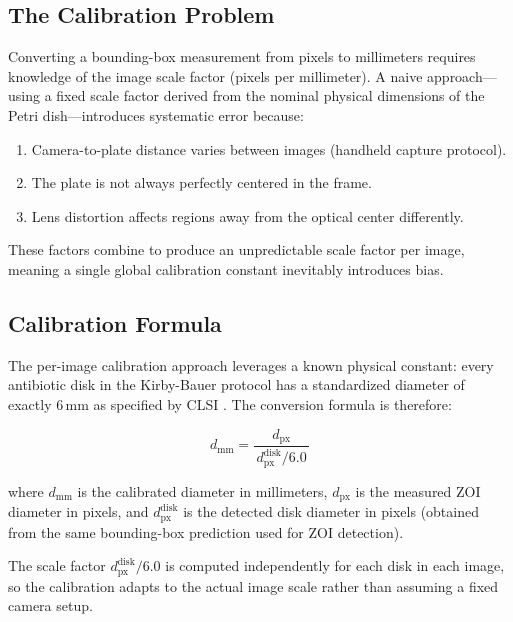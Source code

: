 \subsection{The Calibration Problem}

Converting a bounding-box measurement from pixels to millimeters requires
knowledge of the image scale factor (pixels per millimeter).
A naive approach---using a fixed scale factor derived from the nominal physical dimensions
of the Petri dish---introduces systematic error because:

\begin{enumerate}
  \item Camera-to-plate distance varies between images (handheld capture protocol).
  \item The plate is not always perfectly centered in the frame.
  \item Lens distortion affects regions away from the optical center differently.
\end{enumerate}

These factors combine to produce an unpredictable scale factor per image,
meaning a single global calibration constant inevitably introduces bias.

\subsection{Calibration Formula}

The per-image calibration approach leverages a known physical constant:
every antibiotic disk in the Kirby-Bauer protocol has a standardized diameter of exactly 6\,mm
as specified by CLSI \cite{clsi2025}.
The conversion formula is therefore:

\begin{equation}
  d_{\mathrm{mm}} = \frac{d_{\mathrm{px}}}{\,d^{\mathrm{disk}}_{\mathrm{px}} / 6.0\,}
  \label{eq:calibration}
\end{equation}

where $d_{\mathrm{mm}}$ is the calibrated diameter in millimeters,
$d_{\mathrm{px}}$ is the measured ZOI diameter in pixels,
and $d^{\mathrm{disk}}_{\mathrm{px}}$ is the detected disk diameter in pixels
(obtained from the same bounding-box prediction used for ZOI detection).

The scale factor $d^{\mathrm{disk}}_{\mathrm{px}} / 6.0$ is computed independently for
each disk in each image,
so the calibration adapts to the actual image scale rather than assuming a fixed camera setup.

